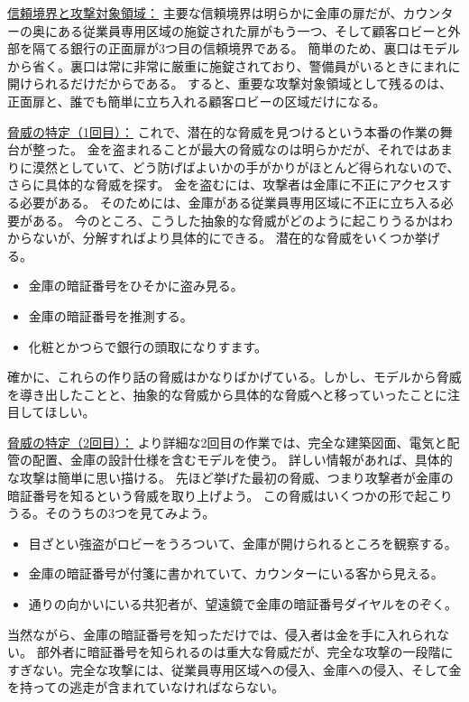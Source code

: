 \documentclass[uplatex]{jsarticle}
\begin{document}
\underline{信頼境界と攻撃対象領域：}
主要な信頼境界は明らかに金庫の扉だが、カウンターの奥にある従業員専用区域の施錠された扉がもう一つ、そして顧客ロビーと外部を隔てる銀行の正面扉が3つ目の信頼境界である。
簡単のため、裏口はモデルから省く。裏口は常に非常に厳重に施錠されており、警備員がいるときにまれに開けられるだけだからである。
すると、重要な攻撃対象領域として残るのは、正面扉と、誰でも簡単に立ち入れる顧客ロビーの区域だけになる。

\underline{脅威の特定（1回目）：}
これで、潜在的な脅威を見つけるという本番の作業の舞台が整った。
金を盗まれることが最大の脅威なのは明らかだが、それではあまりに漠然としていて、どう防げばよいかの手がかりがほとんど得られないので、さらに具体的な脅威を探す。
金を盗むには、攻撃者は金庫に不正にアクセスする必要がある。
そのためには、金庫がある従業員専用区域に不正に立ち入る必要がある。
今のところ、こうした抽象的な脅威がどのように起こりうるかはわからないが、分解すればより具体的にできる。
潜在的な脅威をいくつか挙げる。
\begin{itemize}
\item 金庫の暗証番号をひそかに盗み見る。
\item 金庫の暗証番号を推測する。
\item 化粧とかつらで銀行の頭取になりすます。
\end{itemize}
確かに、これらの作り話の脅威はかなりばかげている。しかし、モデルから脅威を導き出したことと、抽象的な脅威から具体的な脅威へと移っていったことに注目してほしい。

\underline{脅威の特定（2回目）：}
より詳細な2回目の作業では、完全な建築図面、電気と配管の配置、金庫の設計仕様を含むモデルを使う。
詳しい情報があれば、具体的な攻撃は簡単に思い描ける。
先ほど挙げた最初の脅威、つまり攻撃者が金庫の暗証番号を知るという脅威を取り上げよう。
この脅威はいくつかの形で起こりうる。そのうちの3つを見てみよう。
\begin{itemize}
\item 目ざとい強盗がロビーをうろついて、金庫が開けられるところを観察する。
\item 金庫の暗証番号が付箋に書かれていて、カウンターにいる客から見える。
\item 通りの向かいにいる共犯者が、望遠鏡で金庫の暗証番号ダイヤルをのぞく。
\end{itemize}
当然ながら、金庫の暗証番号を知っただけでは、侵入者は金を手に入れられない。
部外者に暗証番号を知られるのは重大な脅威だが、完全な攻撃の一段階にすぎない。完全な攻撃には、従業員専用区域への侵入、金庫への侵入、そして金を持っての逃走が含まれていなければならない。
\end{document}
